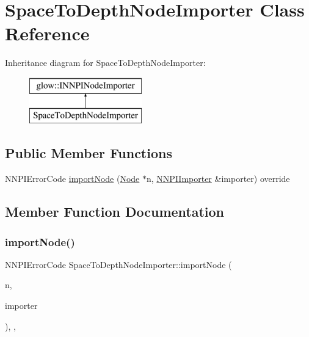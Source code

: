 \hypertarget{class_space_to_depth_node_importer}{}\section{Space\+To\+Depth\+Node\+Importer Class Reference}
\label{class_space_to_depth_node_importer}
Inheritance diagram for Space\+To\+Depth\+Node\+Importer\+:\begin{figure}[H]
\begin{center}
\leavevmode
\includegraphics[height=2.000000cm]{class_space_to_depth_node_importer}
\end{center}
\end{figure}
\subsection*{Public Member Functions}
\begin{DoxyCompactItemize}
\item 
N\+N\+P\+I\+Error\+Code \hyperlink{class_space_to_depth_node_importer_ae096ba2a12aba81d212bd7dc37d9aede}{import\+Node} (\hyperlink{classglow_1_1_node}{Node} $\ast$n, \hyperlink{classglow_1_1_n_n_p_i_importer}{N\+N\+P\+I\+Importer} \&importer) override
\end{DoxyCompactItemize}


\subsection{Member Function Documentation}
\mbox{\label{class_space_to_depth_node_importer_ae096ba2a12aba81d212bd7dc37d9aede}} 
\subsubsection{\texorpdfstring{import\+Node()}{importNode()}}
{\footnotesize\ttfamily N\+N\+P\+I\+Error\+Code Space\+To\+Depth\+Node\+Importer\+::import\+Node (\begin{DoxyParamCaption}\item[{\hyperlink{classglow_1_1_node}{Node} $\ast$}]{n,  }\item[{\hyperlink{classglow_1_1_n_n_p_i_importer}{N\+N\+P\+I\+Importer} \&}]{importer }\end{DoxyParamCaption})\hspace{0.3cm}{\ttfamily [inline]}, {\ttfamily [override]}, {\ttfamily [virtual]}}

